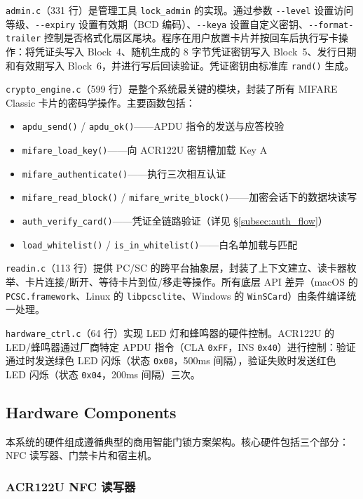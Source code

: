 \documentclass[sigconf]{acmart}
\begin{document}
\texttt{admin.c}（331 行）是管理工具 \texttt{lock\_admin} 的实现。通过参数 \texttt{-{}-level} 设置访问等级、\texttt{-{}-expiry} 设置有效期（BCD 编码）、\texttt{-{}-keya} 设置自定义密钥、\texttt{-{}-format-trailer} 控制是否格式化扇区尾块。程序在用户放置卡片并按回车后执行写卡操作：将凭证头写入 Block~4、随机生成的 8 字节凭证密钥写入 Block~5、发行日期和有效期写入 Block~6，并进行写后回读验证。凭证密钥由标准库 \texttt{rand()} 生成。

\texttt{crypto\_engine.c}（599 行）是整个系统最关键的模块，封装了所有 MIFARE Classic 卡片的密码学操作。主要函数包括：
\begin{itemize}
    \item \texttt{apdu\_send()} / \texttt{apdu\_ok()}——APDU 指令的发送与应答校验
    \item \texttt{mifare\_load\_key()}——向 ACR122U 密钥槽加载 Key A
    \item \texttt{mifare\_authenticate()}——执行三次相互认证
    \item \texttt{mifare\_read\_block()} / \texttt{mifare\_write\_block()}——加密会话下的数据块读写
    \item \texttt{auth\_verify\_card()}——凭证全链路验证（详见 \S\ref{subsec:auth_flow}）
    \item \texttt{load\_whitelist()} / \texttt{is\_in\_whitelist()}——白名单加载与匹配
\end{itemize}

\texttt{readin.c}（113 行）提供 PC/SC 的跨平台抽象层，封装了上下文建立、读卡器枚举、卡片连接/断开、等待卡片到位/移走等操作。所有底层 API 差异（macOS 的 \texttt{PCSC.framework}、Linux 的 \texttt{libpcsclite}、Windows 的 \texttt{WinSCard}）由条件编译统一处理。

\texttt{hardware\_ctrl.c}（64 行）实现 LED 灯和蜂鸣器的硬件控制。ACR122U 的 LED/蜂鸣器通过厂商特定 APDU 指令（CLA \texttt{0xFF}，INS \texttt{0x40}）进行控制：验证通过时发送绿色 LED 闪烁（状态 \texttt{0x08}，500ms 间隔），验证失败时发送红色 LED 闪烁（状态 \texttt{0x04}，200ms 间隔）三次。

\subsection{Hardware Components}

本系统的硬件组成遵循典型的商用智能门锁方案架构。核心硬件包括三个部分：NFC 读写器、门禁卡片和宿主机。

\subsubsection{ACR122U NFC 读写器}
\end{document}
